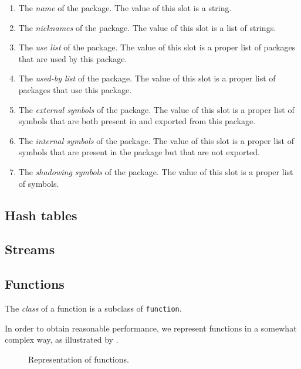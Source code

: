 \begin{enumerate}
\item The \emph{name} of the package.  The value of this slot is a
  string.
\item The \emph{nicknames} of the package.  The value of this slot is
  a list of strings. 
\item The \emph{use list} of the package.  The value of this slot is a
  proper list of packages that are used by this package. 
\item The \emph{used-by list} of the package.  The value of this slot
is a proper list of packages that use this package. 
\item The \emph{external symbols} of the package.  The value of this
  slot is a proper list of symbols that are both present in and
  exported from this package.
\item The \emph{internal symbols} of the package.  The value of this
  slot is a proper list of symbols that are present in the package but
  that are not exported.
\item The \emph{shadowing symbols} of the package.  The value of this
  slot is a proper list of symbols. 
\end{enumerate}

\subsection{Hash tables}

\subsection{Streams}

\subsection{Functions}

The \emph{class} of a function is a subclass of \texttt{function}.

In order to obtain reasonable performance, we represent functions in a
somewhat complex way, as illustrated by
. 

\begin{figure}
\begin{center}
\end{center}
\caption{\label{fig-function-representation}
Representation of functions.}
\end{figure}

